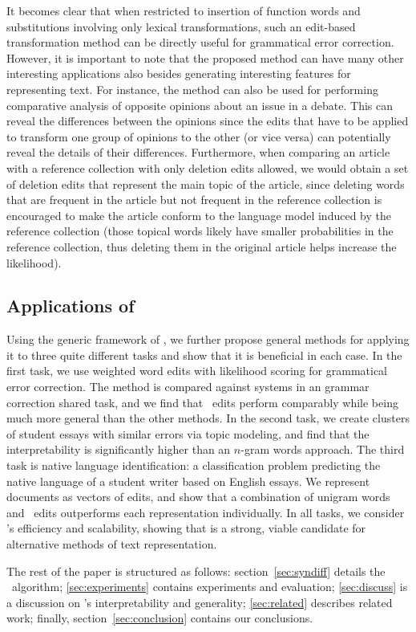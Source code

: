 It becomes clear that when restricted to insertion of function words and
substitutions involving only lexical transformations, such an edit-based
transformation method can be directly useful for grammatical error correction.
However, it is important to note that the proposed method can have many other
interesting applications also besides generating interesting features for
representing text. For instance, the method can also be used for performing
comparative analysis of opposite opinions about an issue in a debate. This can
reveal the differences between the opinions since the edits that have to be
applied to transform one group of opinions to the other (or vice versa) can
potentially reveal the details of their differences. Furthermore, when comparing
an article with a reference collection with only deletion edits allowed, we
would obtain a set of deletion edits that represent the main topic of the
article, since deleting words that are frequent in the article but not frequent
in the reference collection is encouraged to make the article conform to the
language model induced by the reference collection (those topical words likely
have smaller probabilities in the reference collection, thus deleting them in
the original article helps increase the likelihood).

\subsection{Applications of \sd}

Using the generic framework of \sd, we further propose general methods for
applying it to three quite different tasks and show that it is beneficial in
each case. In the first task, we use weighted word edits with likelihood scoring
for grammatical error correction. The method is compared against systems in an
grammar correction shared task, and we find that \sd~edits perform
comparably while being much more general than the other methods. In the
second task, we create clusters of student essays with similar errors via
topic modeling, and find that the interpretability is significantly higher
than an $n$-gram words approach. The third task is native language
identification: a classification problem predicting the native language of a
student writer based on English essays. We represent documents as vectors of
edits, and show that a combination of unigram words and \sd~edits
outperforms each representation individually. In all tasks, we consider
\sd's efficiency and scalability, showing that is a strong, viable candidate
for alternative methods of text representation.

The rest of the paper is structured as follows: section~\ref{sec:syndiff}
details the \sd~algorithm; \ref{sec:experiments} contains experiments and
evaluation; \ref{sec:discuss} is a discussion on \sd's interpretability and
generality; \ref{sec:related} describes related work; finally,
section~\ref{sec:conclusion} contains our conclusions.
